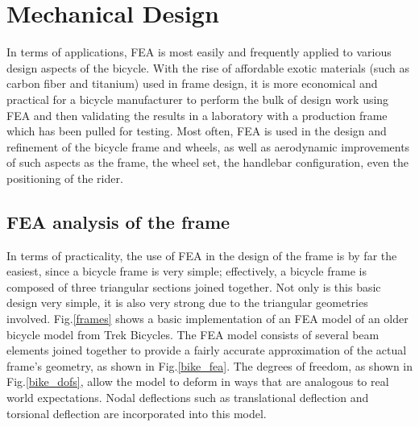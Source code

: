 \documentclass[11pt]{article}
\begin{document}
\section{Mechanical Design}
In terms of applications, FEA is most easily and frequently applied to various design aspects of the bicycle.  With the rise of affordable exotic materials (such as carbon fiber and titanium) used in frame design, it is more economical and practical for a bicycle manufacturer to perform the bulk of design work using FEA and then validating the results in a laboratory with a production frame which has been pulled for testing.  Most often, FEA is used in the design and refinement of the bicycle frame and wheels, as well as aerodynamic improvements of such aspects as the frame, the wheel set, the handlebar configuration, even the positioning of the rider.
\subsection{FEA analysis of the frame}
In terms of practicality, the use of FEA in the design of the frame is by far the easiest, since a bicycle frame is very simple; effectively, a bicycle frame is composed of three triangular sections joined together.  Not only is this basic design very simple, it is also very strong due to the triangular geometries involved.  Fig.\ref{frames} shows a basic implementation of an FEA model of an older bicycle model from Trek Bicycles.  The FEA model consists of several beam elements joined together to provide a fairly accurate approximation of the actual frame's geometry, as shown in Fig.\ref{bike_fea}.  The degrees of freedom, as shown in Fig.\ref{bike_dofs}, allow the model to deform in ways that are analogous to real world expectations.  Nodal deflections such as translational deflection and torsional deflection are incorporated into this model.
\end{document}
